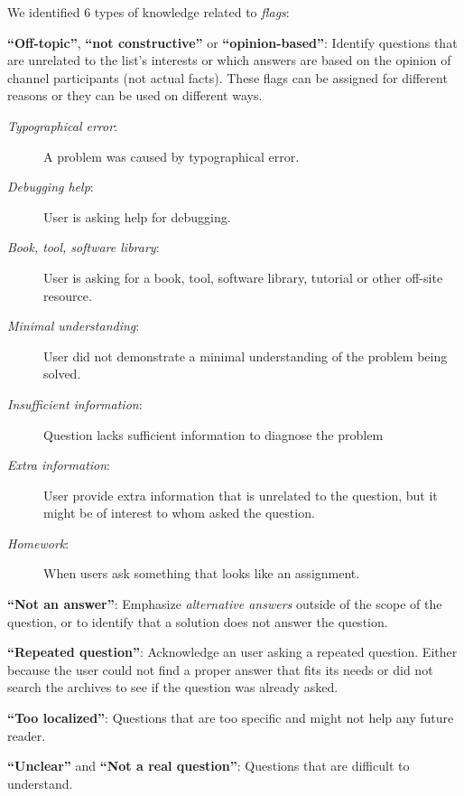 \documentclass{sig-alternate-05-2015}
\begin{document}
	We identified 6 types of knowledge related to \textit{flags}:
	\begin{packed_enum}
		\item \textbf{``Off-topic''}, \textbf{``not constructive''} or \textbf{``opinion-based''}: Identify questions that are unrelated to the list's interests or which answers are based on the opinion of channel participants (not actual facts).
		These flags can be assigned for different reasons or they can be used on different ways.
		\begin{description}
			\item[\textit{Typographical error}:] A problem was caused by typographical error.
			\item[\textit{Debugging help}:] User is asking help for debugging.
			\item[\textit{Book, tool, software library}:] User is asking for a book, tool, software library, tutorial or other off-site resource.
			\item[\textit{Minimal understanding}:] User did not demonstrate a minimal understanding of the problem being solved.
			\item[\textit{Insufficient information}:] Question lacks sufficient information to diagnose the problem
			\item[\textit{Extra information}:] User provide extra information that is unrelated to the question, but it might be of interest to whom asked the question.
			\item[\textit{Homework}:] When users ask something that looks like an assignment.
		\end{description}
		\item \textbf{``Not an answer''}: Emphasize \textit{alternative answers} outside of the scope of the question, or to identify that a solution does not answer the question.
		\item \textbf{``Repeated question''}: Acknowledge an user asking a repeated question.
		Either because the user could not find a proper answer that fits its needs or did not search the archives to see if the question was already asked.
		\item \textbf{``Too localized''}: Questions that are too specific and might not help any future reader.
		\item \textbf{``Unclear''} and  \textbf{``Not a real question''}: Questions that are difficult to understand.
	\end{packed_enum}

\end{document}
